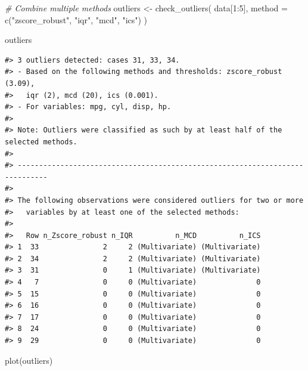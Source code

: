 \documentclass[mathematics,article,submit,moreauthors,pdftex]{mdpi}
\newenvironment{Shaded}{\begin{snugshade}}{\end{snugshade}}
\newcommand{\AttributeTok}[1]{\textcolor[rgb]{0.77,0.63,0.00}{#1}}
\newcommand{\CommentTok}[1]{\textcolor[rgb]{0.56,0.35,0.01}{\textit{#1}}}
\newcommand{\DecValTok}[1]{\textcolor[rgb]{0.00,0.00,0.81}{#1}}
\newcommand{\FunctionTok}[1]{\textcolor[rgb]{0.00,0.00,0.00}{#1}}
\newcommand{\NormalTok}[1]{#1}
\newcommand{\OtherTok}[1]{\textcolor[rgb]{0.56,0.35,0.01}{#1}}
\newcommand{\SpecialCharTok}[1]{\textcolor[rgb]{0.00,0.00,0.00}{#1}}
\newcommand{\StringTok}[1]{\textcolor[rgb]{0.31,0.60,0.02}{#1}}
\begin{document}
\begin{Shaded}
\begin{Highlighting}[]
\CommentTok{\# Combine multiple methods}
\NormalTok{outliers }\OtherTok{\textless{}{-}} \FunctionTok{check\_outliers}\NormalTok{(}
\NormalTok{  data[}\DecValTok{1}\SpecialCharTok{:}\DecValTok{5}\NormalTok{],}
  \AttributeTok{method =} \FunctionTok{c}\NormalTok{(}\StringTok{"zscore\_robust"}\NormalTok{, }\StringTok{"iqr"}\NormalTok{, }\StringTok{"mcd"}\NormalTok{, }\StringTok{"ics"}\NormalTok{)}
\NormalTok{)}

\NormalTok{outliers}
\end{Highlighting}
\end{Shaded}

\begin{verbatim}
#> 3 outliers detected: cases 31, 33, 34.
#> - Based on the following methods and thresholds: zscore_robust (3.09),
#>   iqr (2), mcd (20), ics (0.001).
#> - For variables: mpg, cyl, disp, hp.
#> 
#> Note: Outliers were classified as such by at least half of the selected methods. 
#> 
#> -----------------------------------------------------------------------------
#>  
#> The following observations were considered outliers for two or more
#>   variables by at least one of the selected methods:
#> 
#>   Row n_Zscore_robust n_IQR          n_MCD          n_ICS
#> 1  33               2     2 (Multivariate) (Multivariate)
#> 2  34               2     2 (Multivariate) (Multivariate)
#> 3  31               0     1 (Multivariate) (Multivariate)
#> 4   7               0     0 (Multivariate)              0
#> 5  15               0     0 (Multivariate)              0
#> 6  16               0     0 (Multivariate)              0
#> 7  17               0     0 (Multivariate)              0
#> 8  24               0     0 (Multivariate)              0
#> 9  29               0     0 (Multivariate)              0
\end{verbatim}

\begin{Shaded}
\begin{Highlighting}[]
\FunctionTok{plot}\NormalTok{(outliers)}
\end{Highlighting}
\end{Shaded}
\end{document}
